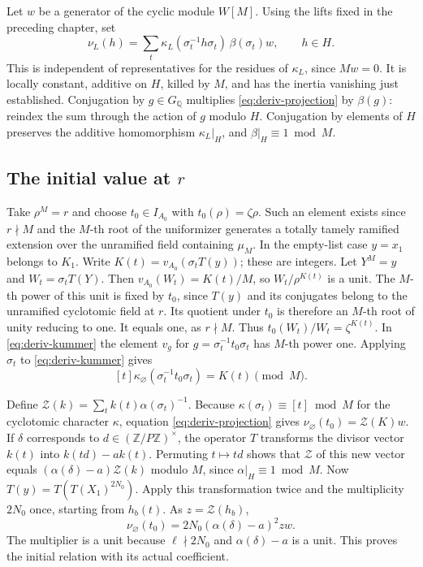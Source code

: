 Let \(w\) be a generator of the cyclic module \(W[M]\). Using the
lifts fixed in the preceding chapter, set
\begin{equation}
    \nu_L(h)=\sum_t \kappa_L(\sigma_t^{-1}h\sigma_t)
                                 \,\beta(\sigma_t)w,\qquad h\in H .
 \label{eq:deriv-projection}
\end{equation}
This is independent of representatives for the residues of
\(\kappa_L\), since \(Mw=0\). It is locally constant, additive on
\(H\), killed by \(M\), and has the inertia vanishing just established.
Conjugation by \(g\in G_{\mathbb Q}\) multiplies \eqref{eq:deriv-projection} by \(\beta(g)\):
reindex the sum through the action of \(g\) modulo \(H\).
Conjugation by elements of \(H\) preserves the additive homomorphism
\(\kappa_L|_H\), and \(\beta|_H\equiv1\bmod M\).

\subsection{The initial value at \(r\)}

Take \(\rho^M=r\) and choose \(t_0\in I_{A_0}\) with
\(t_0(\rho)=\zeta\rho\). Such an element exists since \(r\nmid M\)
and the \(M\)-th root of the uniformizer generates a totally tamely
ramified extension over the unramified field containing \(\mu_M\).
In the empty-list case \(y=x_1\) belongs to \(K_1\). Write
\(K(t)=v_{A_0}(\sigma_t T(y))\); these are integers. Let \(Y^M=y\)
and \(W_t=\sigma_t T(Y)\). Then \(v_{A_0}(W_t)=K(t)/M\), so
\(W_t/\rho^{K(t)}\) is a unit. The \(M\)-th power of this unit is
fixed by \(t_0\), since \(T(y)\) and its conjugates belong to the
unramified cyclotomic field at \(r\). Its quotient under \(t_0\) is
therefore an \(M\)-th root of unity reducing to one. It equals one,
as \(r\nmid M\). Thus \(t_0(W_t)/W_t=\zeta^{K(t)}\). In \eqref{eq:deriv-kummer} the
element \(v_g\) for \(g=\sigma_t^{-1}t_0\sigma_t\) has \(M\)-th
power one. Applying \(\sigma_t\) to \eqref{eq:deriv-kummer} gives
\[
       [t]\kappa_{\varnothing}(\sigma_t^{-1}t_0\sigma_t)
                         =K(t)\pmod M .
\]

Define \(\mathcal Z(k)=\sum_t k(t)\alpha(\sigma_t)^{-1}\).
Because \(\kappa(\sigma_t)\equiv[t]\bmod M\) for the cyclotomic
character \(\kappa\), equation \eqref{eq:deriv-projection} gives
\(\nu_{\varnothing}(t_0)=\mathcal Z(K)w\).
If \(\delta\) corresponds to \(d\in(\mathbb Z/P\mathbb Z)^\times\),
the operator \(T\) transforms the divisor vector \(k(t)\) into
\(k(td)-a k(t)\). Permuting \(t\mapsto td\) shows that \(\mathcal Z\)
of this new vector equals
\((\alpha(\delta)-a)\mathcal Z(k)\) modulo \(M\), since
\(\alpha|_H\equiv1\bmod M\). Now \(T(y)=T(T(X_1)^{2N_0})\).
Apply this transformation twice and the multiplicity \(2N_0\) once,
starting from \(h_b(t)\). As \(z=\mathcal Z(h_b)\),
\begin{equation}
      \nu_{\varnothing}(t_0)
             =2N_0(\alpha(\delta)-a)^2 zw .
 \label{eq:deriv-initial}
\end{equation}
The multiplier is a unit because \(\ell\nmid2N_0\) and
\(\alpha(\delta)-a\) is a unit. This proves the initial relation with
its actual coefficient.

